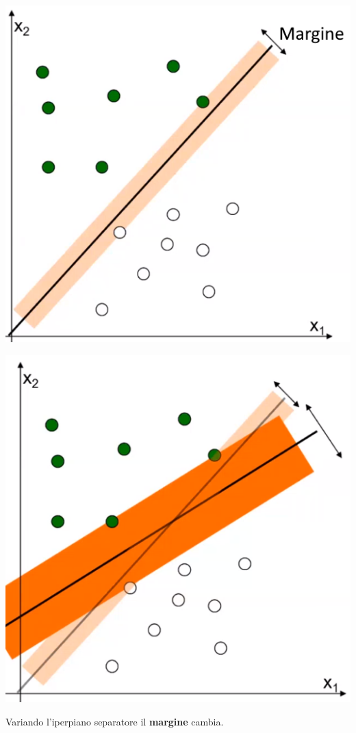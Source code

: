 \documentclass[10pt]{book}
\begin{document}
\begin{multicols}{2}
\begin{center}
	\includegraphics[scale=0.55]{mlmargin.png}
\end{center}\begin{center}
	\includegraphics[scale=0.55]{mlmargin2.png}
\end{center}
\end{multicols}
Variando l'iperpiano separatore il \textbf{margine} cambia.
\end{document}
